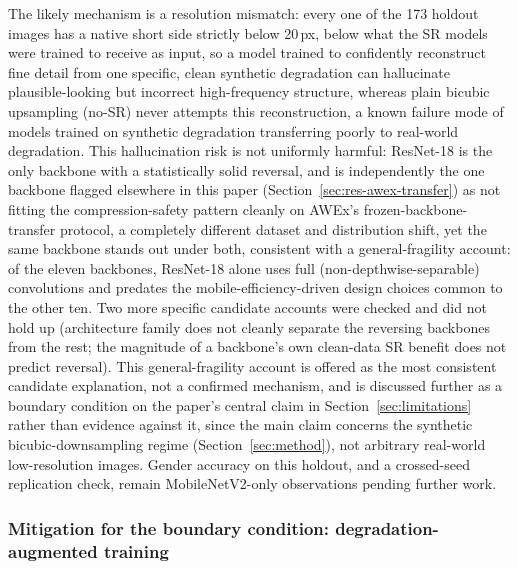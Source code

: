 \documentclass[pdflatex,sn-vancouver-num]{sn-jnl}
\begin{document}
The likely mechanism is a resolution mismatch: every one of the 173 holdout images has a native short side strictly below 20\,px, below what the SR models were trained to receive as input, so a model trained to confidently reconstruct fine detail from one specific, clean synthetic degradation can hallucinate plausible-looking but incorrect high-frequency structure, whereas plain bicubic upsampling (no-SR) never attempts this reconstruction, a known failure mode of models trained on synthetic degradation transferring poorly to real-world degradation. This hallucination risk is not uniformly harmful: ResNet-18 is the only backbone with a statistically solid reversal, and is independently the one backbone flagged elsewhere in this paper (Section~\ref{sec:res-awex-transfer}) as not fitting the compression-safety pattern cleanly on AWEx's frozen-backbone-transfer protocol, a completely different dataset and distribution shift, yet the same backbone stands out under both, consistent with a general-fragility account: of the eleven backbones, ResNet-18 alone uses full (non-depthwise-separable) convolutions and predates the mobile-efficiency-driven design choices common to the other ten. Two more specific candidate accounts were checked and did not hold up (architecture family does not cleanly separate the reversing backbones from the rest; the magnitude of a backbone's own clean-data SR benefit does not predict reversal). This general-fragility account is offered as the most consistent candidate explanation, not a confirmed mechanism, and is discussed further as a boundary condition on the paper's central claim in Section~\ref{sec:limitations} rather than evidence against it, since the main claim concerns the synthetic bicubic-downsampling regime (Section~\ref{sec:method}), not arbitrary real-world low-resolution images. Gender accuracy on this holdout, and a crossed-seed replication check, remain MobileNetV2-only observations pending further work.

\subsubsection{Mitigation for the boundary condition: degradation-augmented training}
\label{sec:degradation-mitigation}
\end{document}
